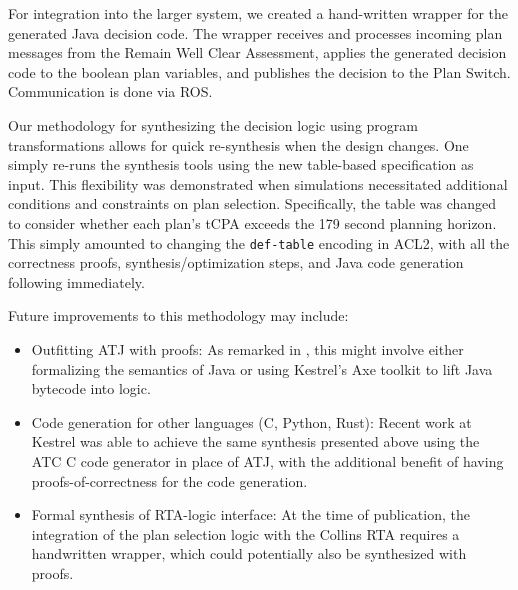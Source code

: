 For integration into the larger system, we created a hand-written wrapper for the generated Java decision code.  The wrapper receives and processes incoming plan messages from the Remain Well Clear Assessment, applies the generated decision code to the boolean plan variables, and publishes the decision to the Plan Switch.  Communication is done via ROS.

Our methodology for synthesizing the decision logic using program transformations allows for quick re-synthesis when the design changes.  One simply re-runs the synthesis tools using the new table-based specification as input.  This flexibility was demonstrated when simulations necessitated additional conditions and constraints on plan selection.  Specifically, the table was changed to consider whether each plan's tCPA exceeds the 179 second planning horizon. This simply amounted to changing the \texttt{def-table} encoding in ACL2, with all the correctness proofs, synthesis/optimization steps, and Java code generation following immediately.

Future improvements to this methodology may include:
\begin{itemize}
\item Outfitting ATJ with proofs: As remarked in \cite{dasc2020}, this might involve either formalizing the semantics of Java or using Kestrel's Axe toolkit to lift Java bytecode into logic.
\item Code generation for other languages (C, Python, Rust): Recent work at Kestrel was able to achieve the same synthesis presented above using the ATC C code generator\cite{atc} in place of ATJ, with the additional benefit of having proofs-of-correctness for the code generation.
\item Formal synthesis of RTA-logic interface: At the time of publication, the integration of the plan selection logic with the Collins RTA requires a handwritten wrapper, which could potentially also be synthesized with proofs.
\end{itemize}
